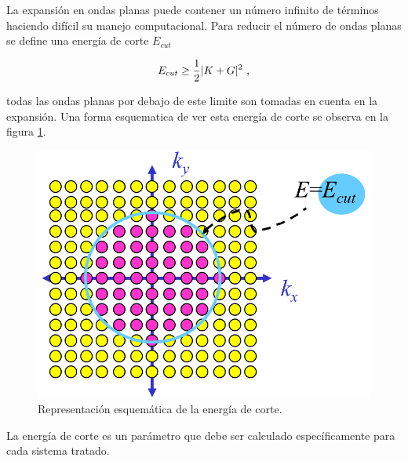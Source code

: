La expansi\'on en ondas planas puede contener un n\'umero infinito de t\'erminos haciendo dif\'icil su manejo computacional. Para reducir el n\'umero de ondas planas se define una energ\'ia de corte $E_{cut}$

\begin{equation}
    E_{cut} \ge \frac{1}{2} |K + G|^{2}  \textup{ ,}
\end{equation}

\noindent todas las ondas planas por debajo de este limite son tomadas en cuenta en la expansi\'on. Una forma esquematica de ver esta energ\'ia de corte se observa en la figura \ref{EnergiaCorte}.


\begin{figure}[H]
    \centering
    \includegraphics[width=0.6\linewidth]{contenido/calculos_computacionales/energia_corte/img_corte/EnergiaCorte}
    \caption{Representaci\'on esquem\'atica de la energ\'ia de corte.}
    \label{EnergiaCorte}
\end{figure}

\noindent La energ\'ia de corte es un par\'ametro que debe ser calculado espec\'ificamente para cada sistema tratado.